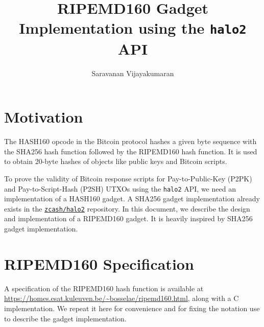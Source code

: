 \documentclass[10pt]{article}
\title{RIPEMD160 Gadget Implementation using the \texttt{halo2} API}
\author{Saravanan Vijayakumaran}
\begin{document}
\maketitle
  
\section{Motivation}%
\label{sec:motivation}
The HASH160 opcode in the Bitcoin protocol hashes a given byte sequence with the SHA256 hash function followed by the RIPEMD160 hash function. It is used to obtain 20-byte hashes of objects like public keys and Bitcoin scripts.

To prove the validity of Bitcoin response scripts for Pay-to-Public-Key (P2PK) and Pay-to-Script-Hash (P2SH) UTXOs using the \texttt{halo2} API, we need an implementation of a HASH160 gadget.
A SHA256 gadget implementation already exists in the \href{https://github.com/zcash/halo2/tree/main/halo2_gadgets/src}{\texttt{zcash/halo2}} repository. In this document, we describe the design and implementation of a RIPEMD160 gadget. It is heavily inspired by SHA256 gadget implementation.

\section{RIPEMD160 Specification}%
\label{sec:ripemd160_specification}
A specification of the RIPEMD160 hash function is available at \url{https://homes.esat.kuleuven.be/~bosselae/ripemd160.html}, along with a C implementation. We repeat it here for convenience and for fixing the notation use to describe the gadget implementation. 



\newpage


\end{document}
